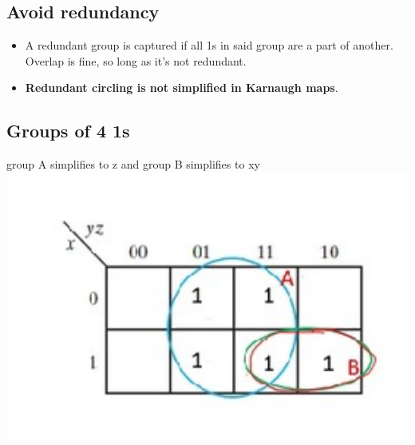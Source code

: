 \documentclass[a4paper,12pt]{article}
\begin{document}
            \subsection*{Avoid redundancy}
              \begin{itemize}
                \item A redundant group is captured if all 1s in said group are a part of another. Overlap is fine, so long as it's not redundant.
                \item \textbf{Redundant circling is not simplified in Karnaugh maps}.
              \end{itemize}
              \hrulefill

             \subsection*{Groups of 4 1s}
              group A simplifies to z and group B simplifies to xy
              \includegraphics*[width=20cm]{groups of 4.jpg}
              
\end{document}
